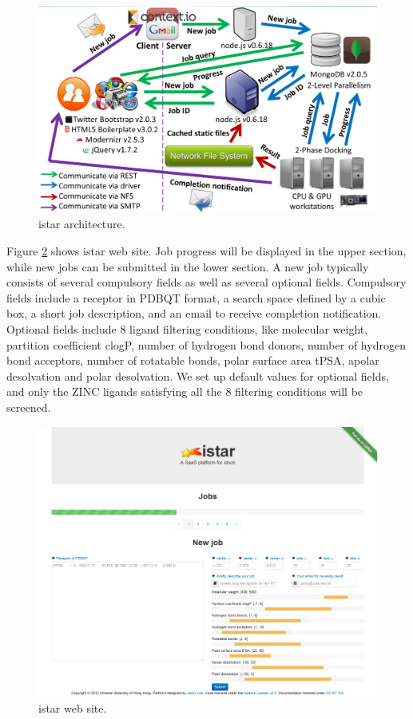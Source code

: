 \begin{figure}
\centering
\includegraphics[width=\linewidth]{istar/Architecture.png}
\caption{istar architecture.}
\label{istar:Architecture}
\end{figure}

Figure \ref{istar:Website} shows istar web site. Job progress will be displayed in the upper section, while new jobs can be submitted in the lower section. A new job typically consists of several compulsory fields as well as several optional fields. Compulsory fields include a receptor in PDBQT format, a search space defined by a cubic box, a short job description, and an email to receive completion notification. Optional fields include 8 ligand filtering conditions, like molecular weight, partition coefficient clogP, number of hydrogen bond donors, number of hydrogen bond acceptors, number of rotatable bonds, polar surface area tPSA, apolar desolvation and polar desolvation. We set up default values for optional fields, and only the ZINC ligands satisfying all the 8 filtering conditions will be screened.

\begin{figure}
\centering
\includegraphics[width=\linewidth]{istar/Website.png}
\caption{istar web site.}
\label{istar:Website}
\end{figure}

